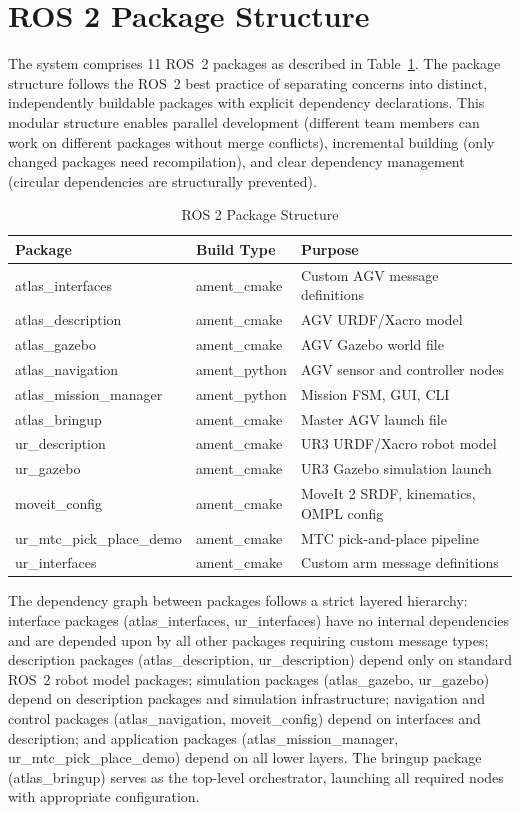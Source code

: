 \documentclass[12pt,a4paper,oneside]{report}
\begin{document}
\section{ROS 2 Package Structure}

The system comprises 11 ROS~2 packages as described in Table~\ref{tab:packages}. The package structure follows the ROS~2 best practice of separating concerns into distinct, independently buildable packages with explicit dependency declarations. This modular structure enables parallel development (different team members can work on different packages without merge conflicts), incremental building (only changed packages need recompilation), and clear dependency management (circular dependencies are structurally prevented).

\begin{table}[H]
\centering
\caption{ROS 2 Package Structure}
\label{tab:packages}
\begin{tabular}{p{4.5cm} p{3cm} p{6cm}}
\toprule
\textbf{Package} & \textbf{Build Type} & \textbf{Purpose} \\
\midrule
atlas\_interfaces & ament\_cmake & Custom AGV message definitions \\
atlas\_description & ament\_cmake & AGV URDF/Xacro model \\
atlas\_gazebo & ament\_cmake & AGV Gazebo world file \\
atlas\_navigation & ament\_python & AGV sensor and controller nodes \\
atlas\_mission\_manager & ament\_python & Mission FSM, GUI, CLI \\
atlas\_bringup & ament\_cmake & Master AGV launch file \\
ur\_description & ament\_cmake & UR3 URDF/Xacro robot model \\
ur\_gazebo & ament\_cmake & UR3 Gazebo simulation launch \\
moveit\_config & ament\_cmake & MoveIt 2 SRDF, kinematics, OMPL config \\
ur\_mtc\_pick\_place\_demo & ament\_cmake & MTC pick-and-place pipeline \\
ur\_interfaces & ament\_cmake & Custom arm message definitions \\
\bottomrule
\end{tabular}
\end{table}

The dependency graph between packages follows a strict layered hierarchy: interface packages (atlas\_interfaces, ur\_interfaces) have no internal dependencies and are depended upon by all other packages requiring custom message types; description packages (atlas\_description, ur\_description) depend only on standard ROS~2 robot model packages; simulation packages (atlas\_gazebo, ur\_gazebo) depend on description packages and simulation infrastructure; navigation and control packages (atlas\_navigation, moveit\_config) depend on interfaces and description; and application packages (atlas\_mission\_manager, ur\_mtc\_pick\_place\_demo) depend on all lower layers. The bringup package (atlas\_bringup) serves as the top-level orchestrator, launching all required nodes with appropriate configuration.
\end{document}

